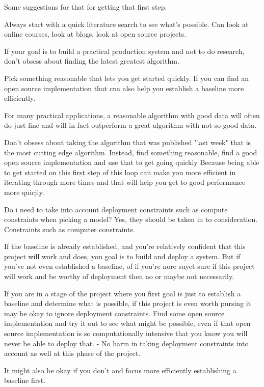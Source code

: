 Some suggestions for that for getting that first step.

Always start with a quick literature search to see what's possible.
Can look at online courses, look at blogs, look at open source projects.

If your goal is to build a practical production system and not to do research, don't obsess about finding the latest greatest algorithm.

Pick something reasonable that lets you get started quickly.
If you can find an open source implementation that cna also help you establish a baseline more efficiently.

For many practical applications, a reasonable algorithm with good data will often do just fine and will in fact outperform a great algorithm with not so good data.

Don't obsess about taking the algorithm that was published "last week" that is the most cutting edge algorithm.
Instead, find something reasonable, find a good open source implementation and use that to get going quickly
Because being able to get started on this first step of this loop can make you more efficient in iterating through more times and that will help you get to good performance more quicjly.

Do i need to take into account deployment constraints such as compute constraints when picking a model?
Yes, they should be taken in to consideration.
Constraints such as computer constraints.

If the baseline is already established, and you're relatively confident that this project will work and does, you goal is to build and deploy a system.
But if you've not even established a baseline, of if you're nore suyet sure if this project will work and be worthy of deployment then no or maybe not necessarily.

If you are in a stage of the project where you first goal is just to establish a baseline and determine what is possible, if this project is even worth pursing it may be okay to ignore deployment constraints.
Find some open source implementation and try it out to see what might be possible, even if that open source implementation is so computationally intensive that you know you will never be able to deploy that.
- No harm in taking deployment constraints into account as well at this phase of the project.

It might also be okay if you don't and focus more efficiently establishing a baseline first.

